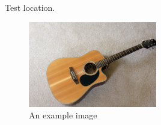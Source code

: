 \documentclass{article}
\begin{document}
\lipsum[1-2] %

Test location.
\begin{figure}[ht]
  \centering
  \includegraphics[width=0.5\textwidth]{guitar.jpg}
  \caption{An example image}
\end{figure}

\lipsum[3-5] %
\end{document}
